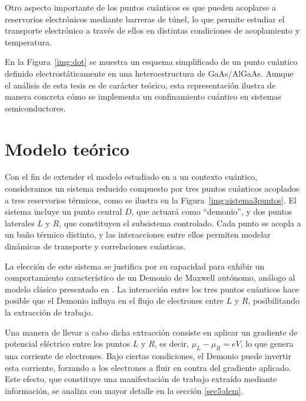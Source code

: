 Otro aspecto importante de los puntos cuánticos es que pueden acoplarse a reservorios electrónicos mediante barreras de túnel, lo que permite estudiar el transporte electrónico a través de ellos en distintas condiciones de acoplamiento y temperatura.

En la Figura~\ref{img:dot} se muestra un esquema simplificado de un punto cuántico definido electrostáticamente en una heteroestructura de GaAs/AlGaAs. Aunque el análisis de esta tesis es de carácter teórico, esta representación ilustra de manera concreta cómo se implementa un confinamiento cuántico en sistemas semiconductores.


\section{Modelo teórico}
\label{modeloteorico}
Con el fin de extender el modelo estudiado en \cite{horowitz2014thermodynamics} a un contexto cuántico, consideramos un sistema reducido compuesto por tres puntos cuánticos acoplados a tres reservorios térmicos, como se ilustra en la Figura~\ref{img:sistema3puntos}. El sistema incluye un punto central $D$, que actuará como ``demonio'', y dos puntos laterales $L$ y $R$, que constituyen el subsistema controlado. Cada punto se acopla a un baño térmico distinto, y las interacciones entre ellos permiten modelar dinámicas de transporte y correlaciones cuánticas.



La elección de este sistema se justifica por su capacidad para exhibir un comportamiento característico de un Demonio de Maxwell autónomo, análogo al modelo clásico presentado en \cite{horowitz2014thermodynamics}. La interacción entre los tres puntos cuánticos hace posible que el Demonio influya en el flujo de electrones entre $L$ y $R$, posibilitando la extracción de trabajo. 

Una manera de llevar a cabo dicha extracción consiste en aplicar un gradiente de potencial eléctrico entre los puntos $L$ y $R$, es decir, $\mu_{L} - \mu_{R} = eV$, lo que genera una corriente de electrones. Bajo ciertas condiciones, el Demonio puede invertir esta corriente, forzando a los electrones a fluir en contra del gradiente aplicado. Este efecto, que constituye una manifestación de trabajo extraído mediante información, se analiza con mayor detalle en la sección \ref{sec5:dem}. 

